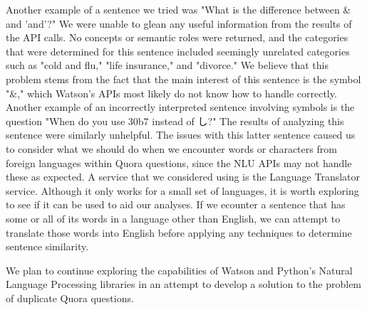 \documentclass{sig-alternate}
\begin{document}
Another example of a sentence we tried was "What is the difference between \& and 'and'?" We were unable to glean any useful information from the results of the API calls. No concepts or semantic roles were returned, and the categories that were determined for this sentence included seemingly unrelated categories such as "cold and flu," "life insurance," and "divorce." We believe that this problem stems from the fact that the main interest of this sentence is the symbol "\&," which Watson's APIs most likely do not know how to handle correctly. Another example of an incorrectly interpreted sentence involving symbols is the question "When do you use \char30b7 instead of し?" The results of analyzing this sentence were similarly unhelpful. The issues with this latter sentence caused us to consider what we should do when we encounter words or characters from foreign languages within Quora questions, since the NLU APIs may not handle these as expected. A service that we considered using is the Language Translator service. Although it only works for a small set of languages, it is worth exploring to see if it can be used to aid our analyses. If we ecounter a sentence that has some or all of its words in a language other than English, we can attempt to translate those words into English before applying any techniques to determine sentence similarity. 

We plan to continue exploring the capabilities of Watson and Python's Natural Language Processing libraries in an attempt to develop a solution to the problem of duplicate Quora questions.



\balance
\end{document}
